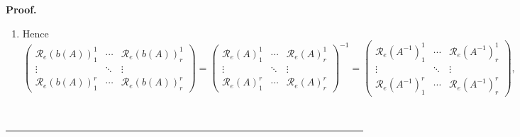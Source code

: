 \documentclass[aps,preprint]{revtex4}
\newenvironment{proof}[1][Proof]{\noindent\textbf{#1.} }{\ \rule{0.5em}{0.5em}}
\begin{document}
\begin{proof}
\begin{enumerate}
\begin{enumerate}
\begin{eqnarray}
\begin{array}{ccc}
\mathcal{R}_{e}\left( b\left( A\right) \right) _{r}^{1} & \cdots & \mathcal{R%
}_{e}\left( b\left( A\right) \right) _{r}^{r}%
\end{array}%
\right) ^{t}\left( 
\begin{array}{ccc}
\mathcal{R}_{e}\left( A\right) _{1}^{1} & \cdots & \mathcal{R}_{e}\left(
A\right) _{r}^{1} \\ 
\vdots & \ddots & \vdots \\ 
\mathcal{R}_{e}\left( A\right) _{1}^{r} & \cdots & \mathcal{R}_{e}\left(
A\right) _{r}^{r}%
\end{array}%
\right) =\left( 
\begin{array}{ccc}
\mathcal{R}_{e}\left( b\left( A\right) \right) _{1}^{1} & \cdots & \mathcal{R%
}_{e}\left( b\left( A\right) \right) _{r}^{1} \\ 
\vdots & \ddots & \vdots \\ 
\mathcal{R}_{e}\left( b\left( A\right) \right) _{1}^{r} & \cdots & \mathcal{R%
}_{e}\left( b\left( A\right) \right) _{r}^{r}%
\end{array}%
\right) \left( 
\begin{array}{ccc}
\mathcal{R}_{e}\left( A\right) _{1}^{1} & \cdots & \mathcal{R}_{e}\left(
A\right) _{r}^{1} \\ 
\vdots & \ddots & \vdots \\ 
\mathcal{R}_{e}\left( A\right) _{1}^{r} & \cdots & \mathcal{R}_{e}\left(
A\right) _{r}^{r}%
\end{array}%
\right) \\
&=&\mathbb{I}_{r}
\end{eqnarray}

\item Hence 
\begin{equation}
\left( 
\begin{array}{ccc}
\mathcal{R}_{e}\left( b\left( A\right) \right) _{1}^{1} & \cdots & \mathcal{R%
}_{e}\left( b\left( A\right) \right) _{r}^{1} \\ 
\vdots & \ddots & \vdots \\ 
\mathcal{R}_{e}\left( b\left( A\right) \right) _{1}^{r} & \cdots & \mathcal{R%
}_{e}\left( b\left( A\right) \right) _{r}^{r}%
\end{array}%
\right) =\left( 
\begin{array}{ccc}
\mathcal{R}_{e}\left( A\right) _{1}^{1} & \cdots & \mathcal{R}_{e}\left(
A\right) _{r}^{1} \\ 
\vdots & \ddots & \vdots \\ 
\mathcal{R}_{e}\left( A\right) _{1}^{r} & \cdots & \mathcal{R}_{e}\left(
A\right) _{r}^{r}%
\end{array}%
\right) ^{-1}=\left( 
\begin{array}{ccc}
\mathcal{R}_{e}\left( A^{-1}\right) _{1}^{1} & \cdots & \mathcal{R}%
_{e}\left( A^{-1}\right) _{r}^{1} \\ 
\vdots & \ddots & \vdots \\ 
\mathcal{R}_{e}\left( A^{-1}\right) _{1}^{r} & \cdots & \mathcal{R}%
_{e}\left( A^{-1}\right) _{r}^{r}%
\end{array}%
\right) ,
\end{equation}


\end{enumerate}
\end{enumerate}
\end{proof}
\end{document}
